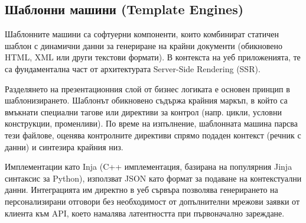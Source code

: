 \subsection{Шаблонни машини (Template Engines)}

Шаблонните машини са софтуерни компоненти, които комбинират статичен шаблон с динамични данни за генериране на крайни документи (обикновено HTML, XML или други текстови формати). В контекста на уеб приложенията, те са фундаментална част от архитектурата Server-Side Rendering (SSR).

Разделянето на презентационния слой от бизнес логиката е основен принцип в шаблонизирането. Шаблонът обикновено съдържа крайния маркъп, в който са вмъкнати специални тагове или директиви за контрол (напр. цикли, условни конструкции, променливи). По време на изпълнение, шаблонната машина парсва тези файлове, оценява контролните директиви спрямо подаден контекст (речник с данни) и синтезира крайния низ.

Имплементации като Inja (C++ имплементация, базирана на популярния Jinja синтаксис за Python), използват JSON като формат за подаване на контекстуални данни. Интеграцията им директно в уеб сървъра позволява генерирането на персонализирани отговори без необходимост от допълнителни мрежови заявки от клиента към API, което намалява латентността при първоначално зареждане.

